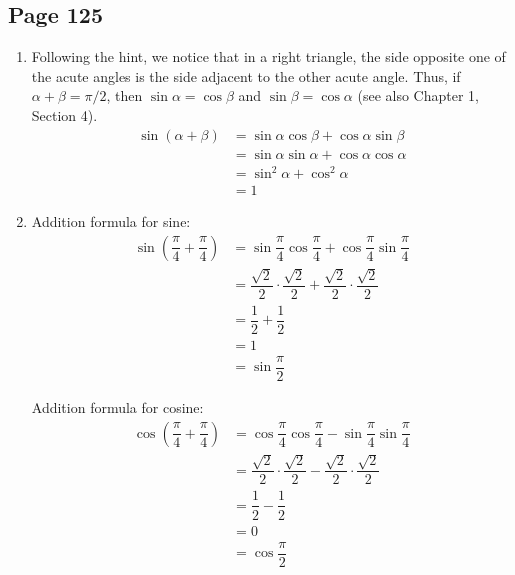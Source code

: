\documentclass{article}
\newenvironment{solutions}[1]
{\subsection*{#1}
 \begin{enumerate}[leftmargin=1.5em]}
{\end{enumerate}}
\newcommand{\solution}{\item}
\begin{document}
\begin{solutions}{Page 125}
Difference formula for cosine ($\beta = 0$):
\begin{align*}
\cos\left(\alpha + 0\right) 
&= \cos{\alpha}\cos{0} + \sin{\alpha}\sin{0} \\
&= \cos{\alpha} \cdot 1 + \sin{\alpha} \cdot 0 \\
&= \cos{\alpha}
\end{align*}

\solution %
Following the hint, we notice that in a right triangle, the side opposite one of the acute angles is the side adjacent to the other acute angle. Thus, if $\alpha + \beta = \pi/2$, then $\sin{\alpha} = \cos{\beta}$ and $\sin{\beta} = \cos{\alpha}$ (see also Chapter 1, Section 4).
\begin{align*}
\sin\left(\alpha + \beta\right)
&= \sin{\alpha} \cos{\beta}  + \cos{\alpha}\sin{\beta} \\
&= \sin{\alpha}\sin{\alpha} + \cos{\alpha}\cos{\alpha} \\
&= \sin^{2}{\alpha} + \cos^{2}{\alpha} \\
&= 1
\end{align*}

\solution %
Addition formula for sine:
\begin{align*}
\sin\left(\dfrac{\pi}{4} + \dfrac{\pi}{4}\right)
&= \sin{\dfrac{\pi}{4}}\cos{\dfrac{\pi}{4}} + \cos{\dfrac{\pi}{4}}\sin{\dfrac{\pi}{4}} \\
&= \dfrac{\sqrt{2}}{2} \cdot \dfrac{\sqrt{2}}{2} + \dfrac{\sqrt{2}}{2} \cdot \dfrac{\sqrt{2}}{2} \\
&= \dfrac{1}{2} + \dfrac{1}{2} \\
&= 1 \\
&= \sin{\dfrac{\pi}{2}}
\end{align*}

Addition formula for cosine:
\begin{align*}
\cos\left(\dfrac{\pi}{4} + \dfrac{\pi}{4}\right)
&= \cos{\dfrac{\pi}{4}}\cos{\dfrac{\pi}{4}} - \sin{\dfrac{\pi}{4}}\sin{\dfrac{\pi}{4}} \\
&= \dfrac{\sqrt{2}}{2} \cdot \dfrac{\sqrt{2}}{2} - \dfrac{\sqrt{2}}{2} \cdot \dfrac{\sqrt{2}}{2} \\
&= \dfrac{1}{2} - \dfrac{1}{2} \\
&= 0 \\
&= \cos{\dfrac{\pi}{2}}
\end{align*}


\end{solutions}
\end{document}

